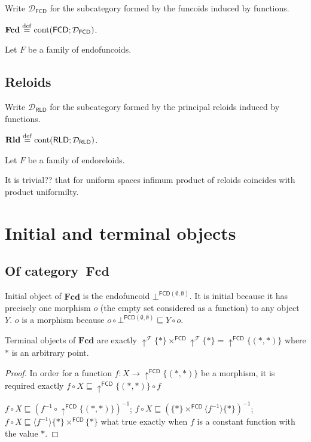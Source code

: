 Write $\mathcal D_{\mathsf{FCD}}$ for the subcategory formed by
the funcoids induced by functions.

\begin{defn}
  $\mathbf{Fcd} \overset{\mathrm{def}}{=} \operatorname{cont}(\mathsf{FCD};\mathcal D_{\mathsf{FCD}})$.
\end{defn}

Let $F$ be a family of endofuncoids.

\subsection{Reloids}

Write $\mathcal D_{\mathsf{RLD}}$ for the subcategory formed by
the principal reloids induced by functions.

\begin{defn}
  $\mathbf{Rld} \overset{\mathrm{def}}{=} \operatorname{cont}(\mathsf{RLD};\mathcal D_{\mathsf{RLD}})$.
\end{defn}

Let $F$ be a family of endoreloids.

It is trivial?? that for uniform spaces infimum product of reloids coincides
with product uniformilty.

\section{Initial and terminal objects}

\subsection{Of category~$\mathbf{Fcd}$}

Initial object of $\mathbf{Fcd}$ is the endofuncoid
$\bot^{\mathsf{FCD} (\emptyset , \emptyset)}$. It is
initial because it has precisely one morphism $o$ (the empty set considered as
a function) to any object $Y$. $o$ is a morphism because $o \circ
\bot^{\mathsf{FCD} (\emptyset , \emptyset)} \sqsubseteq Y
\circ o$.

\begin{prop}
  Terminal objects of $\mathbf{Fcd}$ are exactly
  $\uparrow^{\mathscr{F}} \{ \ast \} \times^{\mathsf{FCD}}
  \uparrow^{\mathscr{F}} \{ \ast \} = \uparrow^{\mathsf{FCD}} \{ (\ast
  , \ast) \}$ where $\ast$ is an arbitrary point.
\end{prop}

\begin{proof}
  In order for a function $f : X \rightarrow \uparrow^{\mathsf{FCD}} \{
  (\ast , \ast) \}$ be a morphism, it is required exactly $f \circ X
  \sqsubseteq \uparrow^{\mathsf{FCD}} \{ (\ast , \ast) \} \circ f$
  
  $f \circ X \sqsubseteq (f^{- 1} \circ \uparrow^{\mathsf{FCD}} \{
  (\ast , \ast) \})^{- 1}$; $f \circ X \sqsubseteq (\{ \ast \}
  \times^{\mathsf{FCD}} \langle f^{- 1} \rangle \{ \ast \})^{- 1}$; $f
  \circ X \sqsubseteq \langle f^{- 1} \rangle \{ \ast \}
  \times^{\mathsf{FCD}} \{ \ast \}$ what true exactly when $f$ is a
  constant function with the value $\ast$.
\end{proof}

